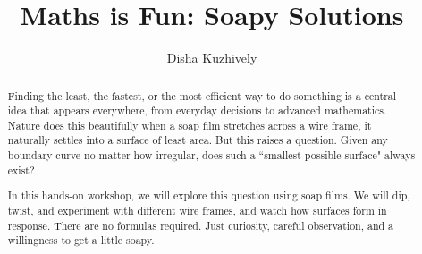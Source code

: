 \documentclass[12pt,a4paper]{article}
\title{Maths is Fun: Soapy Solutions}
\author{Disha Kuzhively}
\begin{document}
\maketitle
\begin{abstract}
    Finding the least, the fastest, or the most efficient way to do something is a central idea that appears everywhere,  from everyday decisions to advanced mathematics. Nature does this beautifully when a soap film stretches across a wire frame, it naturally settles into a surface of least area. But this raises a question. Given any boundary curve no matter how irregular, does such a ``smallest possible surface" always exist?

    In this hands-on workshop, we will explore this question using soap films. We will dip, twist, and experiment with different wire frames, and watch how surfaces form in response. There are no formulas required. Just curiosity, careful observation, and a willingness to get a little soapy.
\end{abstract}
\end{document}
